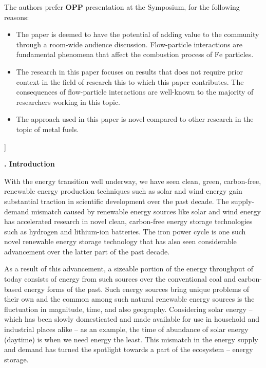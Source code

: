 \documentclass[twocolumn,10pt,dvipsnames]{article} %
\newcommand{\mrm}[1]{\mathrm{#1}}
\renewcommand{\section}%
              [1]%
              {%
               \bgroup%
               \flushleft%
               \small\bf%
               \refstepcounter{section}%
               \arabic{section}. #1%
               \par%
               \egroup%
              }%
\begin{document}
\begin{@twocolumnfalse}
The authors prefer \textbf{OPP} presentation at the Symposium, for the following reasons:

\begin{itemize}

  \item The paper is deemed to have the potential of adding value to the community through a room-wide audience discussion. Flow-particle interactions are fundamental phenomena that affect the combustion process of $\mrm{Fe}$ particles.

  \item The research in this paper focuses on results that does not require prior context in the field of research this to which this paper contributes. The consequences of flow-particle interactions are well-known to the majority of researchers working in this topic.

  \item The approach used in this paper is novel compared to other research in the topic of metal fuels.

\end{itemize}

\end{@twocolumnfalse}] 


\clearpage

\linenumbers

\section{Introduction}
\label{sec:introduction}
\addvspace{10pt}

With the energy transition well underway, we have seen clean, green, carbon-free, renewable energy production techniques such as solar and wind energy gain substantial traction in scientific development over the past decade. The supply-demand mismatch caused by renewable energy sources like solar and wind energy has accelerated research in novel clean, carbon-free energy storage technologies such as hydrogen and lithium-ion batteries. The iron power cycle is one such novel renewable energy storage technology that has also seen considerable advancement over the latter part of the past decade.

\iffalse As a result of this advancement, a sizeable portion of the energy throughput of today consists of energy from such sources over the conventional coal and carbon-based energy forms of the past. Such energy sources bring unique problems of their own and the common among such natural renewable energy sources is the fluctuation in magnitude, time, and also geography. Considering solar energy -- which has been slowly domesticated and made available for use in household and industrial places alike -- as an example, the time of abundance of solar energy (daytime) is when we need energy the least. This mismatch in the energy supply and demand has turned the spotlight towards a part of the ecosystem -- energy storage. 
\end{document}
